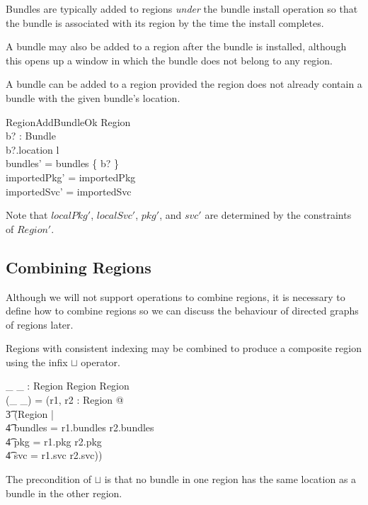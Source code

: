 \documentclass[a4paper,9pt]{article}
\begin{document}
Bundles are typically added to regions \textit{under} the bundle install operation
so that the bundle is associated with its region by the time the
install completes.

A bundle may also be added to a region after the bundle is installed, although this opens up a window in
which the bundle does not belong to any region.

A bundle can be added to a region provided the region does not already contain a bundle with
the given bundle's location.
\begin{schema}{RegionAddBundleOk}
  \Delta Region \\
  b? : Bundle \\
\where
  b?.location \notin \dom l \\
  bundles' = bundles \cup \{ b? \} \\
  importedPkg' = importedPkg \\
  importedSvc' = importedSvc \\
\end{schema}
Note that $localPkg'$, $localSvc'$, $pkg'$, and $svc'$ are determined by the constraints of $Region'$.

\subsection{Combining Regions}

Although we will not support operations to combine regions, it is necessary to define how to combine
regions so we can discuss the behaviour of directed graphs of regions later.

Regions with consistent indexing may be combined to produce a composite region using the infix $\sqcup$ operator.
\begin{axdef}
 \_ \sqcup \_ : Region \cross Region \pfun Region \\
\where
 (\_ \sqcup \_) = (\lambda r1, r2 : Region @ \\
\t3 (\mu Region | \\
\t4 bundles = r1.bundles \cup r2.bundles \land \\
\t4 pkg = r1.pkg \cup r2.pkg \land \\
\t4 svc = r1.svc \cup r2.svc)) \\
\end{axdef}
The precondition of $\sqcup$ is that no bundle in one region has the same location as a bundle in the other region.
\end{document}

